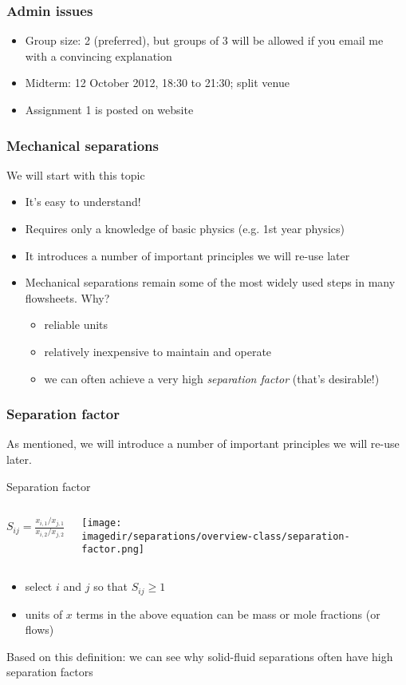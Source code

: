 \begin{frame}\frametitle{Admin issues}
	\begin{itemize}
		\item	Group size: 2 (preferred), but groups of 3 will be allowed if you email me with a convincing explanation
		\item	Midterm: 12 October 2012, 18:30 to 21:30; split venue
		\item	Assignment 1 is posted on website
	\end{itemize}
\end{frame}

\begin{frame}\frametitle{Mechanical separations}
	We will start with this topic
	\begin{itemize}
		\item	It's easy to understand!
		\item	Requires only a knowledge of basic physics (e.g. 1st year physics)
		\item	It introduces a number of important principles we will re-use later
		\item	Mechanical separations remain some of the most widely used steps in many flowsheets. Why?
		\begin{itemize}
			\item	reliable units
			\item	relatively inexpensive to maintain and operate
			\item	we can often achieve a very high \emph{separation factor} (that's desirable!)
		\end{itemize}
	\end{itemize}
\end{frame}

\begin{frame}\frametitle{Separation factor}
	As mentioned, we will introduce a number of important principles we will re-use later.
	
	\begin{exampleblock}{Separation factor}
		\begin{columns}[c]
				$S_{ij} = \displaystyle \frac{x_{i,1} / x_{j,1}}{x_{i,2} / x_{j,2}}$
				\begin{center}
					\texttt{[image: \\imagedir/separations/overview-class/separation-factor.png]}
				\end{center}
		\end{columns} 
	\end{exampleblock}
	
	\begin{itemize}
		\item	select $i$ and $j$ so that $S_{ij} \geq 1$
		\item	units of $x$ terms in the above equation can be mass or mole fractions (or flows) 		
	\end{itemize}
	
	Based on this definition: we can see why solid-fluid separations often have high separation factors
\end{frame}

